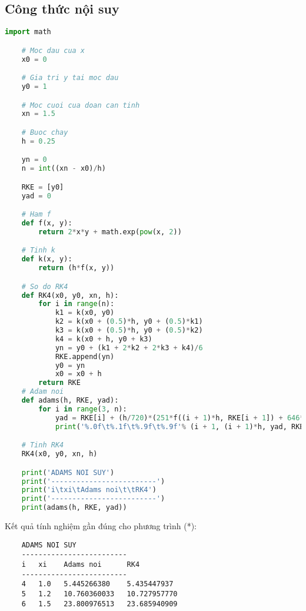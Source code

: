 \subsection{Công thức nội suy}
\begin{lstlisting}[language=Python]
	import math

	# Moc dau cua x
	x0 = 0

	# Gia tri y tai moc dau
	y0 = 1

	# Moc cuoi cua doan can tinh
	xn = 1.5

	# Buoc chay
	h = 0.25

	yn = 0
	n = int((xn - x0)/h)

	RKE = [y0]
	yad = 0

	# Ham f
	def f(x, y):
	    return 2*x*y + math.exp(pow(x, 2))

	# Tinh k
	def k(x, y):
		return (h*f(x, y))

	# So do RK4
	def RK4(x0, y0, xn, h):
	    for i in range(n):
	        k1 = k(x0, y0)
	        k2 = k(x0 + (0.5)*h, y0 + (0.5)*k1)
	        k3 = k(x0 + (0.5)*h, y0 + (0.5)*k2)
	        k4 = k(x0 + h, y0 + k3)
	        yn = y0 + (k1 + 2*k2 + 2*k3 + k4)/6
	        RKE.append(yn)
	        y0 = yn
	        x0 = x0 + h
	    return RKE
	# Adam noi
	def adams(h, RKE, yad):
		for i in range(3, n):
			yad = RKE[i] + (h/720)*(251*f((i + 1)*h, RKE[i + 1]) + 646*f(i*h, RKE[i]) - 264*f((i - 1)*h, RKE[i - 1]) + 106*f((i - 2)*h, RKE[i - 2]) - 19*f((i - 3)*h, RKE[i - 3]))
			print('%.0f\t%.1f\t%.9f\t%.9f'% (i + 1, (i + 1)*h, yad, RKE[i + 1]))

	# Tinh RK4
	RK4(x0, y0, xn, h)

	print('ADAMS NOI SUY')
	print('-------------------------')    
	print('i\txi\tAdams noi\t\tRK4')
	print('-------------------------')
	print(adams(h, RKE, yad))
\end{lstlisting}

Kết quả tính nghiệm gần đúng cho phương trình (*):
\begin{lstlisting}
	ADAMS NOI SUY
	-------------------------
	i   xi    Adams noi      RK4
	-------------------------
	4   1.0   5.445266380    5.435447937
	5   1.2   10.760360033   10.727957770
	6   1.5   23.800976513   23.685940909
\end{lstlisting}

